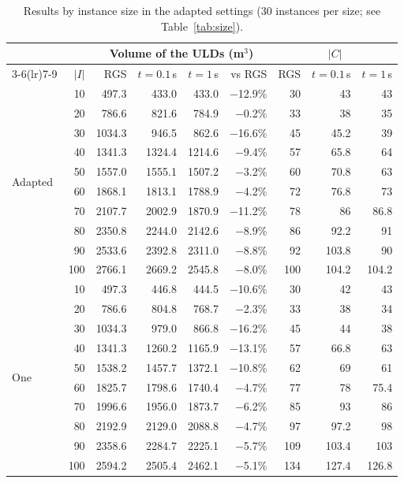 \begin{table}[htbp]
\centering
\small\setlength{\tabcolsep}{4pt}
\caption{Results by instance size in the adapted settings (30 instances per size; see
Table~\ref{tab:size}).}
\label{tab:size2}
\begin{tabular}{lrrrrrrrr}
\toprule
 & & \multicolumn{4}{c}{Volume of the ULDs (m$^3$)} & \multicolumn{3}{c}{$|C|$} \\
\cmidrule(lr){3-6}\cmidrule(lr){7-9}
 & $|I|$ & RGS & $t = 0.1$\,s & $t = 1$\,s & vs RGS & RGS & $t = 0.1$\,s & $t = 1$\,s \\
\midrule
\multirow{10}{*}{Adapted} & 10 & 497.3 & 433.0 & 433.0 & $-$12.9\% & 30 & 43 & 43 \\
 & 20 & 786.6 & 821.6 & 784.9 & $-$0.2\% & 33 & 38 & 35 \\
 & 30 & 1034.3 & 946.5 & 862.6 & $-$16.6\% & 45 & 45.2 & 39 \\
 & 40 & 1341.3 & 1324.4 & 1214.6 & $-$9.4\% & 57 & 65.8 & 64 \\
 & 50 & 1557.0 & 1555.1 & 1507.2 & $-$3.2\% & 60 & 70.8 & 63 \\
 & 60 & 1868.1 & 1813.1 & 1788.9 & $-$4.2\% & 72 & 76.8 & 73 \\
 & 70 & 2107.7 & 2002.9 & 1870.9 & $-$11.2\% & 78 & 86 & 86.8 \\
 & 80 & 2350.8 & 2244.0 & 2142.6 & $-$8.9\% & 86 & 92.2 & 91 \\
 & 90 & 2533.6 & 2392.8 & 2311.0 & $-$8.8\% & 92 & 103.8 & 90 \\
 & 100 & 2766.1 & 2669.2 & 2545.8 & $-$8.0\% & 100 & 104.2 & 104.2 \\
\midrule
\multirow{10}{*}{One} & 10 & 497.3 & 446.8 & 444.5 & $-$10.6\% & 30 & 42 & 43 \\
 & 20 & 786.6 & 804.8 & 768.7 & $-$2.3\% & 33 & 38 & 34 \\
 & 30 & 1034.3 & 979.0 & 866.8 & $-$16.2\% & 45 & 44 & 38 \\
 & 40 & 1341.3 & 1260.2 & 1165.9 & $-$13.1\% & 57 & 66.8 & 63 \\
 & 50 & 1538.2 & 1457.7 & 1372.1 & $-$10.8\% & 62 & 69 & 61 \\
 & 60 & 1825.7 & 1798.6 & 1740.4 & $-$4.7\% & 77 & 78 & 75.4 \\
 & 70 & 1996.6 & 1956.0 & 1873.7 & $-$6.2\% & 85 & 93 & 86 \\
 & 80 & 2192.9 & 2129.0 & 2088.8 & $-$4.7\% & 97 & 97.2 & 98 \\
 & 90 & 2358.6 & 2284.7 & 2225.1 & $-$5.7\% & 109 & 103.4 & 103 \\
 & 100 & 2594.2 & 2505.4 & 2462.1 & $-$5.1\% & 134 & 127.4 & 126.8 \\
\bottomrule
\end{tabular}
\end{table}


